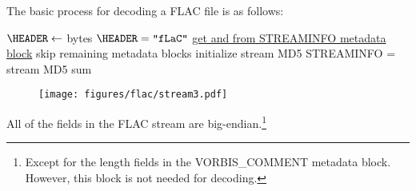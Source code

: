 The basic process for decoding a FLAC file is as follows:
\par
\noindent
{}
$\HEADER \leftarrow$  bytes\;
\ASSERT $\text{\HEADER} = \texttt{"fLaC"}$\;
\hyperref[flac:read_metadata]{get \PCMCOUNT and \MDSUM from STREAMINFO metadata block}\;
skip remaining metadata blocks\;
initialize stream MD5\;
\ASSERT STREAMINFO \MDSUM = stream MD5 sum
\EALGORITHM
\begin{figure}[h]
\texttt{[image: figures/flac/stream3.pdf]}
\end{figure}
\par
All of the fields in the FLAC stream are big-endian.\footnote{Except
for the length fields in the VORBIS\_COMMENT metadata block.
However, this block is not needed for decoding.
}

\clearpage


